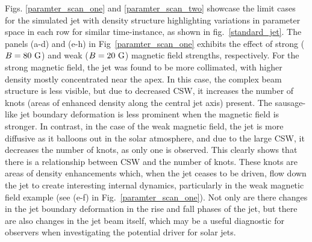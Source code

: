 %
%
Figs. \ref{paramter_scan_one} and \ref{paramter_scan_two} showcase the limit cases for the simulated jet with density structure highlighting variations in parameter space in each row for similar time-instance, as shown in fig.~\ref{standard_jet}. The panels (a-d) and (e-h) in Fig~\ref{paramter_scan_one} exhibits the effect of strong ($B = 80~\rm{G}$) and weak ($B = 20~\rm{G}$) magnetic field strengths, respectively. For the strong magnetic field, the jet was found to be more collimated, with higher density mostly concentrated near the apex. In this case, the complex beam structure is less visible, but due to decreased CSW, it increases the number of knots (areas of enhanced density along the central jet axis) present. The sausage-like jet boundary deformation is less prominent when the magnetic field is stronger. In contrast, in the case of the weak magnetic field, the jet is more diffusive as it balloons out in the solar atmosphere, and due to the large CSW, it decreases the number of knots, as only one is observed. This clearly shows that there is a relationship between CSW and the number of knots. These knots are areas of density enhancements which, when the jet ceases to be driven, flow down the jet to create interesting internal dynamics, particularly in the weak magnetic field example (see (e-f) in Fig.~\ref{paramter_scan_one}). Not only are there changes in the jet boundary deformation in the rise and fall phases of the jet, but there are also changes in the jet beam itself, which may be a useful diagnostic for observers when investigating the potential driver for solar jets. \np    
%
